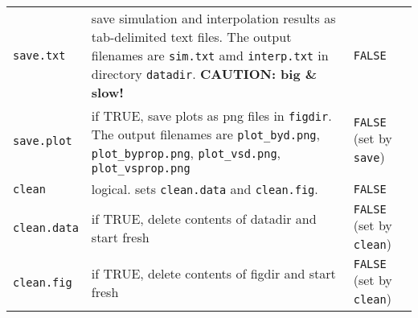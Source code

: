 \begin{tabular}{m{}m{}m{}}
\texttt{save.txt} & save simulation and interpolation results as tab-delimited text files. The output filenames are \texttt{sim.txt} amd \texttt{interp.txt} in directory \texttt{datadir}. \textbf{CAUTION: big \& slow!} & \texttt{FALSE} \\
\texttt{save.plot} & if TRUE, save plots as png files in \texttt{figdir}. The output filenames are \texttt{plot\_byd.png}, \texttt{plot\_byprop.png}, \texttt{plot\_vsd.png}, \texttt{plot\_vsprop.png} & \texttt{FALSE} (set by \texttt{save}) \\
\texttt{clean} & logical. sets \texttt{clean.data} and \texttt{clean.fig}. & \texttt{FALSE} \\
\texttt{clean.data} & if TRUE, delete contents of datadir and start fresh & \texttt{FALSE} (set by \texttt{clean}) \\
\texttt{clean.fig} & if TRUE, delete contents of figdir and start fresh & \texttt{FALSE} (set by \texttt{clean}) \\
\bottomrule
\end{tabular}
\endgroup
